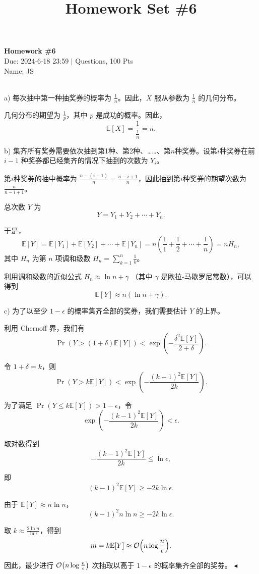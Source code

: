 \documentclass[11pt]{article}
\title{Homework Set \#6}
\newenvironment{question}[2][Question]{\begin{trivlist}
\item[\hskip \labelsep {\bfseries #1}\hskip \labelsep {\bfseries #2.}]}{\hfill$\blacktriangleleft$\end{trivlist}}
\newcommand\E{\mathbb{E}}
\begin{document}
    \pagestyle{fancy}
    \chead{}

    \begin{center}
        {\LARGE \bf Homework \#6}\\
        {Due: 2024-6-18 23:59 \quad$|$ Questions, 100 Pts}\\
        {Name: JS}
    \end{center}

    \begin{question}{1 (15') (Coupon Collector)}~\\

   a) 
每次抽中第一种抽奖券的概率为 \(\frac{1}{n}\)。因此，\(X\) 服从参数为 \(\frac{1}{n}\) 的几何分布。

几何分布的期望为 \( \frac{1}{p} \)，其中 \(p\) 是成功的概率。因此，
\[ \E[X] = \frac{1}{\frac{1}{n}} = n. \]

 b)
集齐所有奖券需要依次抽到第1种、第2种、……、第\(n\)种奖券。设第\(i\)种奖券在前 \(i-1\) 种奖券都已经集齐的情况下抽到的次数为 \(Y_i\)。

第\(i\)种奖券的抽中概率为 \(\frac{n - (i-1)}{n} = \frac{n - i + 1}{n}\)，因此抽到第\(i\)种奖券的期望次数为 \(\frac{n}{n - i + 1}\)。

总次数 \(Y\) 为
\[ Y = Y_1 + Y_2 + \cdots + Y_n. \]

于是，
\[ \E[Y] = \E[Y_1] + \E[Y_2] + \cdots + \E[Y_n] = n \left( \frac{1}{1} + \frac{1}{2} + \cdots + \frac{1}{n} \right) = n H_n, \]
其中 \(H_n\) 为第 \(n\) 项调和级数 \(H_n = \sum_{k=1}^{n} \frac{1}{k}\)。

利用调和级数的近似公式 \( H_n \approx \ln{n} + \gamma \) （其中 \(\gamma\) 是欧拉-马歇罗尼常数），可以得到
\[ \E[Y] \approx n (\ln{n} + \gamma). \]

c) 
为了以至少 \(1 - \epsilon\) 的概率集齐全部的奖券，我们需要估计 \(Y\) 的上界。

利用 Chernoff 界，我们有
\[ \Pr(Y > (1 + \delta) \E[Y]) < \exp \left( -\frac{\delta^2 \E[Y]}{2 + \delta} \right). \]

令 \(1 + \delta = k\)，则
\[ \Pr(Y > k \E[Y]) < \exp \left( -\frac{(k - 1)^2 \E[Y]}{2k} \right). \]

为了满足 \( \Pr(Y \leq k \E[Y]) > 1 - \epsilon \)，令
\[ \exp \left( -\frac{(k - 1)^2 \E[Y]}{2k} \right) < \epsilon. \]

取对数得到
\[ -\frac{(k - 1)^2 \E[Y]}{2k} \leq \ln{\epsilon}, \]

即
\[ (k - 1)^2 \E[Y] \geq -2k \ln{\epsilon}. \]

由于 \( \E[Y] \approx n \ln{n} \)，
\[ (k - 1)^2 n \ln{n} \geq -2k \ln{\epsilon}. \]

取 \( k \approx \frac{2 \ln{n}}{\ln{\epsilon}} \)，得到
\[ m = k \E[Y] \approx \order{n \log{\frac{n}{\epsilon}}}. \]

因此，最少进行 \(\order{n \log{\frac{n}{\epsilon}}}\) 次抽取以高于 \(1 - \epsilon\) 的概率集齐全部的奖券。
    \end{question}
\end{document}

